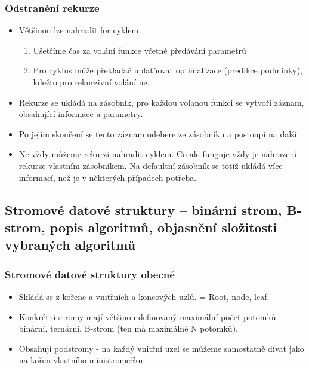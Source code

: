 \documentclass[10pt,a4paper]{article}
\begin{document}
\subsubsection{Odstranění rekurze}

\begin{itemize}
\item Většinou lze nahradit for cyklem.
\begin{enumerate}
\item Ušetříme čas za volání funkce včetně předávání parametrů
\item Pro cyklus může překladač uplatňovat optimalizace (predikce podmínky), kdežto pro rekurzivní volání ne.
\end{enumerate}
\item Rekurze se ukládá na zásobník, pro každou volanou funkci se vytvoří záznam, obsahující informace a parametry.
\item Po jejím skončení se tento záznam odebere ze zásobníku a postoupí na další.
\item Ne vždy můžeme rekurzi nahradit cyklem. Co ale funguje vždy je nahrazení rekurze vlastním zásobníkem. Na defaultní zásobník se totiž ukládá více informací, než je v některých případech potřeba.
\end{itemize}
\subsection{Stromové datové struktury – binární strom, B-strom, popis algoritmů, objasnění složitosti vybraných algoritmů}
\subsubsection{Stromové datové struktury obecně}
\begin{itemize}
\item Skládá se z kořene a vnitřních a koncových uzlů. = Root, node, leaf.
\item Konkrétní stromy mají většinou definovaný maximální počet potomků - binární, ternární, B-strom (ten má maximálně N potomků).
\item Obsahují podstromy - na každý vnitřní uzel se můžeme samostatně dívat jako na kořen vlastního ministromečku.
\end{itemize}
\end{document}
